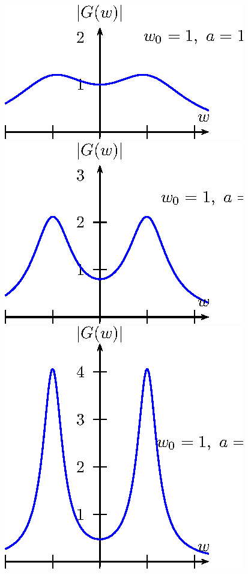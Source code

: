 \documentclass[a4paper,10pt]{book}
\begin{document}
  \begin{figure}[!ht]
  \begin{center}
  \includegraphics{figs/cap_propriedades_transformada_figura_4}
  \includegraphics{figs/cap_propriedades_transformada_figura_5}
  \includegraphics{figs/cap_propriedades_transformada_figura_6}

\end{center}
\end{figure}
\end{document}
